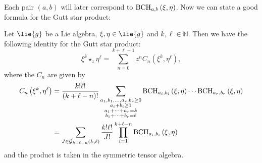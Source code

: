 Each pair $(a,b)$ will later correspond to $\mathrm{BCH}_{a, b}\left(\xi, \eta\right)$.
Now we can state a good formula for the Gutt star product:
\begin{lemma}
	\label{Formulas:Lemma:2MonomialsFormula1}
	Let $\lie{g}$ be a Lie algebra, $\xi, \eta \in \lie{g}$ and $k, 
	\ell \in \mathbb{N}$. Then we have the following identity for the 
	Gutt star product:
	\begin{equation*}
    	\xi^k \star_z \eta^{\ell}
    	=
	    \sum\limits_{n=0}^{k + \ell -1}
    	z^n
    	C_n \left( \xi^k, \eta^{\ell} \right),
	\end{equation*}
	where the $C_n$ are given by
	\begin{align}
		\label{Formulas:2MonomialsExplicit}
        C_n \left( \xi^k, \eta^{\ell} \right)
        & =
        \frac{k! \ell!}{(k + \ell - n)!}
        \sum\limits_{\substack{a_1, b_1, \ldots, a_r, b_r \geq 0 \\
            a_i + b_i \geq 1 \\
            a_1 + \cdots + a_r = k \\
            b_1 + \cdots + b_r = \ell
        }}
        \mathrm{BCH}_{a_i, b_i}\left(\xi, \eta\right)
        \cdots
        \mathrm{BCH}_{a_r, b_r}\left(\xi, \eta\right)
        \\
        \label{Formulas:2MonomialsFormula1}
        & =
        \sum\limits_{J \in \mathcal{G}_{k + \ell - n}(k, \ell)}
        \frac{k! \ell!}{J!}
        \prod\limits_{i = 1}^{k + \ell - n}        
        \mathrm{BCH}_{a_i, b_i}\left(\xi, \eta\right)
	\end{align}
	and the product is taken in the symmetric tensor algebra.
\end{lemma}

